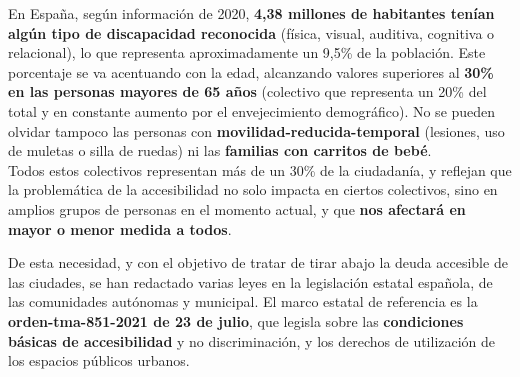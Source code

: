 En España, según información de 2020, \textbf{4,38 millones de habitantes tenían algún tipo de discapacidad reconocida} (física, visual, auditiva, cognitiva o relacional), lo que representa aproximadamente un 9,5\% de la población. Este porcentaje se va acentuando con la edad, alcanzando valores superiores al \textbf{30\% en las personas mayores de 65 años} (colectivo que representa un 20\% del total y en constante aumento por el envejecimiento demográfico). No se pueden olvidar tampoco las personas con \textbf{\gls{movilidad-reducida-temporal}} (lesiones, uso de muletas o silla de ruedas) ni las \textbf{familias con carritos de bebé}.
\\

Todos estos colectivos representan más de un 30\% de la ciudadanía, y reflejan que la problemática de la accesibilidad no solo impacta en ciertos colectivos, sino en amplios grupos de personas en el momento actual, y que \textbf{nos afectará en mayor o menor medida a todos}.

De esta necesidad, y con el objetivo de tratar de tirar abajo la deuda accesible de las ciudades, se han redactado varias leyes en la legislación estatal española, de las comunidades autónomas y municipal.
El marco estatal de referencia es la \textbf{\gls{orden-tma-851-2021} de 23 de julio}, que legisla sobre las \textbf{condiciones básicas de accesibilidad} y no discriminación, y los derechos de utilización de los espacios públicos urbanos.
\\

